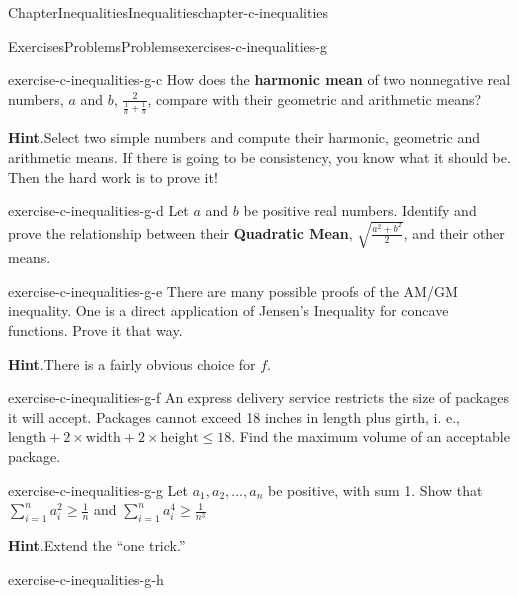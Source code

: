 \documentclass[oneside,10pt,]{book}
\newcommand{\blocktitlefont}{\relax}
\newcommand{\terminology}[1]{\textbf{#1}}
\numberwithin{equation}{section}
\begin{document}
\begin{chapterptx}{Chapter}{Inequalities}{}{Inequalities}{}{}{chapter-c-inequalities}
\begin{exercises-section}{Exercises}{Problems}{}{Problems}{}{}{exercises-c-inequalities-g}
\begin{divisionexercise}{2}{}{}{exercise-c-inequalities-g-c}
%
How does the \terminology{harmonic mean} of two nonnegative real numbers, \(a\) and \(b\),  \(\frac{2}{\frac{1}{a}+\frac{1}{b}}\), compare with their geometric and arithmetic means?%
\par\smallskip%
\noindent\textbf{\blocktitlefont Hint}.\hypertarget{hint-c-inequalities-g-c-c}{}\quad{}Select two simple numbers and compute their harmonic, geometric and arithmetic means.  If there is going to be consistency, you know what it should be.  Then the hard work is to prove it!%
\end{divisionexercise}%
\begin{divisionexercise}{3}{}{}{exercise-c-inequalities-g-d}%
%
Let \(a\) and \(b\) be positive real numbers. Identify and prove the relationship between their \terminology{Quadratic Mean}, \(\sqrt{\frac{a^2 + b^2}{2}}\), and their other means.%
\end{divisionexercise}%
\begin{divisionexercise}{4}{}{}{exercise-c-inequalities-g-e}%
There are many possible proofs of the AM\slash{}GM inequality.  One is a direct application of Jensen's Inequality for concave functions.  Prove it that way.%
\par\smallskip%
\noindent\textbf{\blocktitlefont Hint}.\hypertarget{hint-c-inequalities-g-e-b}{}\quad{}There is a fairly obvious choice for \(f\).%
\end{divisionexercise}%
\begin{divisionexercise}{5}{}{}{exercise-c-inequalities-g-f}%
An express delivery service restricts the size of packages it will accept.  Packages cannot exceed 18 inches in length plus girth, i. e., \(\text{length}+2\times\text{width} +2\times \text{height}\leq 18\).  Find the maximum volume of an acceptable package.%
\end{divisionexercise}%
\begin{divisionexercise}{6}{}{}{exercise-c-inequalities-g-g}%
Let \(a_1, a_2, \ldots, a_{n }\) be positive, with sum 1.    Show that \(\sum _{i=1}^n a_i^2\geq \frac{1}{n}\)  and   \(\sum _{i=1}^n
a_i^4\geq \frac{1}{n^3}\)%
\par\smallskip%
\noindent\textbf{\blocktitlefont Hint}.\hypertarget{hint-c-inequalities-g-g-b}{}\quad{}Extend the ``one trick.''%
\end{divisionexercise}%
\begin{divisionexercise}{7}{}{}{exercise-c-inequalities-g-h}%
%
\end{divisionexercise}
\end{exercises-section}
\end{chapterptx}
\end{document}
